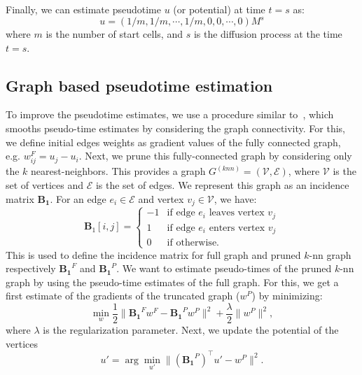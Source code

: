 Finally, we can estimate pseudotime $u$ (or potential) at time $t=s$ as:
\begin{equation}
\label{eqn:potential}
u = (1/m, 1/m,\cdots, 1/m, 0,0,\cdots,0)M^{s}
\end{equation}
\noindent where $m$ is the number of start cells, and $s$ is the diffusion process at the time $t=s$.


\subsection{Graph based pseudotime estimation}

To improve the pseudotime estimates, we use a procedure similar to~\cite{maehara2019ddhodge}, which smooths pseudo-time estimates by considering the graph connectivity. For this, we define initial edges weights as gradient values of the fully connected graph, e.g. $w^{F}_{ij}=u_j - u_i$. Next, we prune this fully-connected graph by considering only the $k$ nearest-neighbors. This provides a graph $G^{(knn)}=(\mathcal{V}, \mathcal{E})$, where $\mathcal{V}$ is the set of vertices and $\mathcal{E}$ is the set of edges.
We represent this graph as an incidence matrix $\mathbf{B_1}$. For an edge $e_i \in \mathcal{E}$ and vertex $v_j \in \mathcal{V}$, we have:
\begin{equation}
\label{eqn:incidencematrix1}
\mathbf{B}_1[i,j] = \begin{cases}
-1 &\text{if edge } e_i \text{ leaves  vertex }v_j \\
1 &\text{if edge } e_i \text{ enters  vertex }v_j \\
0 &\text{if otherwise}.
\end{cases}
\end{equation}
This is used to define the incidence matrix for full graph and pruned $k$-nn graph respectively $\mathbf{B_1}^F$ and $\mathbf{B_1}^P$.
\noindent We want to estimate pseudo-times of the pruned $k$-nn graph by using the pseudo-time estimates of the full graph. For this, we get a first estimate of the gradients of the truncated graph ($w^P$) by minimizing:
\begin{equation}
\label{eqn:ddhodge1}
    \min_{w}\frac{1}{2}\|\mathbf{B_1}^F w^F - \mathbf{B_1}^P w^P\|^2 + \frac{\lambda}{2}\|w^P\|^2,
\end{equation}
\noindent where $\lambda$ is the regularization parameter. Next, we update the potential of the vertices
\begin{equation}
\label{eqn:ddhodge2}
  u' = \arg\underset{u'}{\min}\|(\mathbf{B_1}^P)^\top u' - w^P\|^2.
\end{equation}
